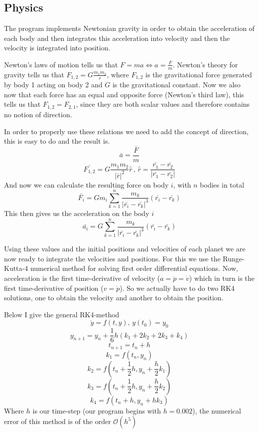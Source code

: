 \documentclass[a4paper,12pt]{article} \usepackage{graphicx}
\begin{document}
\subsection{Physics}
The program implements Newtonian gravity in order to obtain the acceleration of each body and then integrates this acceleration into velocity and then the velocity is integrated into position.

Newton's laws of motion tells us that $F=ma \Leftrightarrow a = \frac{F}{m}$. Newton's theory for gravity tells us that $F_{1,2} = G\frac{m_1m_2}{r}$, where $F_{1,2}$ is the gravitational force generated by body 1 acting on body 2 and $G$ is the gravitational constant. Now we also now that each force has an equal and opposite force (Newton's third law), this tells us that $F_{1,2} = F_{2,1}$, since they are both scalar values and therefore contains no notion of direction.

In order to properly use these relations we need to add the concept of direction, this is easy to do and the result is.
\[
\bar{a} = \frac{\bar{F}}{m}
\]
\[
\bar{F_{1,2}} = G\frac{m_1m_2}{|\bar{r}|^2}\hat{r} \, , \, \hat{r} = \frac{\bar{r_1} - \bar{r_2}}{|\bar{r_1} - \bar{r_2}|}
\]
And now we can calculate the resulting force on body $i$, with $n$ bodies in total
\[
\bar{F_i} = G m_i\sum_{k=1}^n \frac{m_k}{|\bar{r_i} - \bar{r_k}|^3}\left( \bar{r_i} - \bar{r_k} \right)
\]
This then gives us the acceleration on the body $i$
\[
\bar{a_i} = G \sum_{k=1}^n \frac{m_k}{|\bar{r_i} - \bar{r_k}|^3}\left( \bar{r_i} - \bar{r_k} \right)
\]

Using these values and the initial positions and velocities of each planet we are now ready to integrate the velocities and positions. For this we use the Runge-Kutta-4 numerical method for solving first order differential equations. Now, acceleration is the first time-derivative of velocity ($a=\ddot{p} = \dot{v}$) which in turn is the first time-derivative of position ($v=\dot{p}$). So we actually have to do two RK4 solutions, one to obtain the velocity and another to obtain the position.

Below I give the general RK4-method
\[
\dot{y}=f(t,y),\,y(t_0)=y_0
\]
\[
y_{n+1} = y_n + \frac{1}{6}h\left( k_1 + 2k_2 + 2k_3 + k_4\right)
\]
\[
t_{n+1} = t_n +h
\]
\[
k_1 = f(t_n,y_n)
\]
\[
k_2 = f(t_n + \frac{1}{2}h,y_n + \frac{h}{2}k_1)
\]
\[
k_3 = f(t_n + \frac{1}{2}h,y_n + \frac{h}{2}k_2)
\]
\[
k_4 = f(t_n + h,y_n + hk_3)
\]
Where $h$ is our time-step (our program begins with $h = 0.002$), the numerical error of this method is of the order $\mathcal{O}(h^5)$
\end{document}
